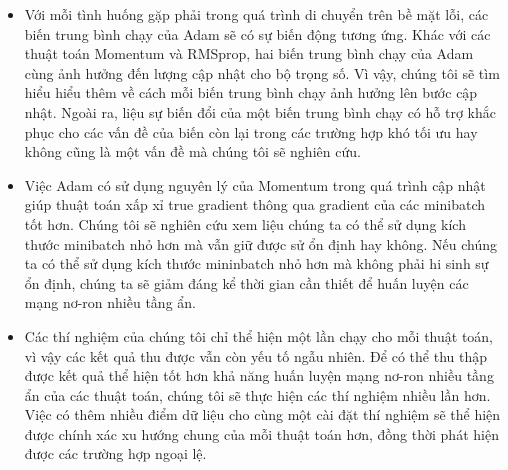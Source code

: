 \begin{itemize}
	\item Với mỗi tình huống gặp phải trong quá trình di chuyển trên bề mặt lỗi, các biến trung bình chạy của Adam sẽ có sự biến động tương ứng. Khác với các thuật toán Momentum và RMSprop, hai biến trung bình chạy của Adam cùng ảnh hưởng đến lượng cập nhật cho bộ trọng số. Vì vậy, chúng tôi sẽ tìm hiểu hiểu thêm về cách mỗi biến trung bình chạy ảnh hưởng lên bước cập nhật. Ngoài ra, liệu sự biến đổi của một biến trung bình chạy có hỗ trợ khắc phục cho các vấn đề của biến còn lại trong các trường hợp khó tối ưu hay không cũng là một vấn đề mà chúng tôi sẽ nghiên cứu.
	\item Việc Adam có sử dụng nguyên lý của Momentum trong quá trình cập nhật giúp thuật toán xấp xỉ true gradient thông qua gradient của các minibatch tốt hơn. Chúng tôi sẽ nghiên cứu xem liệu chúng ta có thể sử dụng kích thước minibatch nhỏ hơn mà vẫn giữ được sử ổn định hay không. Nếu chúng ta có thể sử dụng kích thước mininbatch nhỏ hơn mà không phải hi sinh sự ổn định, chúng ta sẽ giảm đáng kể thời gian cần thiết để huấn luyện các mạng nơ-ron nhiều tầng ẩn.
	\item Các thí nghiệm của chúng tôi chỉ thể hiện một lần chạy cho mỗi thuật toán, vì vậy các kết quả thu được vẫn còn yếu tố ngẫu nhiên. Để có thể thu thập được kết quả thể hiện tốt hơn khả năng huấn luyện mạng nơ-ron nhiều tầng ẩn của các thuật toán, chúng tôi sẽ thực hiện các thí nghiệm nhiều lần hơn. Việc có thêm nhiều điểm dữ liệu cho cùng một cài đặt thí nghiệm sẽ thể hiện được chính xác xu hướng chung của mỗi thuật toán hơn, đồng thời phát hiện được các trường hợp ngoại lệ.
\end{itemize}